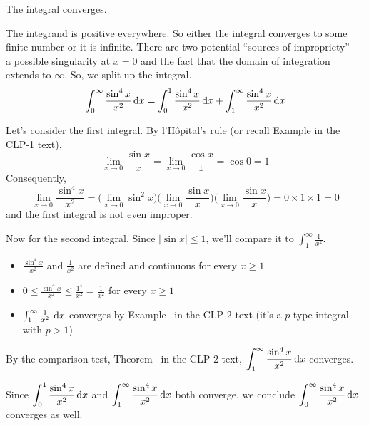 \begin{answer}
The integral converges.
\end{answer}

\begin{solution}
The integrand is positive everywhere. So either the integral
converges to some finite number or it is infinite. There are two potential
``sources of impropriety'' --- a possible singularity at $x=0$ and
the fact that the domain of integration extends to $\infty$.
So, we split up the integral.
\begin{equation*}
\int_0^\infty\frac{\sin^4 x}{x^2}\, \mathrm{d}x
=\int_0^1\frac{\sin^4 x}{x^2}\, \mathrm{d}x
  + \int_1^\infty\frac{\sin^4 x}{x^2}\, \mathrm{d}x
\end{equation*}

Let's consider the first integral. By l'H\^opital's rule
(or recall Example  in the CLP-1 text),
\begin{equation*}
\lim_{x\to 0} \frac{\sin x}{x}
=\lim_{x\to 0} \frac{\cos x}{1}
=\cos 0
=1
\end{equation*}
Consequently,
\begin{equation*}
\lim_{x\to 0} \frac{\sin^4 x}{x^2}
=\Big(\lim_{x\to 0} \sin^2 x \Big)
\Big(\lim_{x\to 0} \frac{\sin x}{x} \Big)
\Big(\lim_{x\to 0} \frac{\sin x}{x} \Big)
=0\times 1\times 1
=0
\end{equation*}
and the first integral is not even improper.

Now for the second integral. Since $|\sin x|\le 1$, we'll compare it to $\int_1^\infty \frac{1}{x^2}$.
\begin{itemize}
\item $\frac{\sin^4 x}{x^2}$ and $\frac{1}{x^2}$ are defined and continuous for every $x \geq 1$
\item $0 \leq \frac{\sin^4 x}{x^2} \leq \frac{1^4}{x^2} = \frac{1}{x^2}$ for every $x \geq 1$
\item $\int_1^\infty \frac{1}{x^2}~\mathrm{d}x$ converges by Example~
 in the CLP-2 text (it's a $p$-type integral with $p>1$)
\end{itemize}

By the comparison test, Theorem~ in the CLP-2 text,
$\displaystyle\int_1^\infty\frac{\sin^4 x}{x^2}\, \mathrm{d}x$ converges.

Since $\displaystyle\int_0^1\frac{\sin^4 x}{x^2}\, \mathrm{d}x$ and $\displaystyle\int_1^\infty\frac{\sin^4 x}{x^2}\, \mathrm{d}x$ both converge, we conclude
$\displaystyle\int_0^\infty\frac{\sin^4 x}{x^2}\, \mathrm{d}x$ converges as well.
\end{solution}


